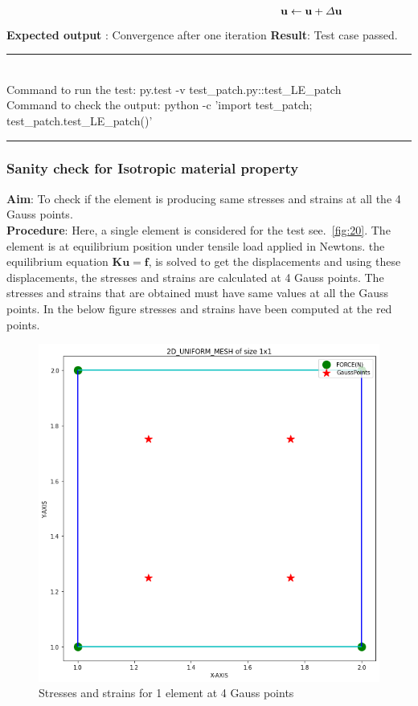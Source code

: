 \documentclass[fleqn, 12.5pt,a4paper]{report}
\begin{document}
\begin{align}\label{eq:114}\hspace{6.5cm}
\mathbf{u} \leftarrow \mathbf{u}+\Delta \mathbf{u}
\end{align}
\textbf{Expected output} : Convergence after one iteration\newline 
\textbf{Result}: Test case passed.\\
{\rule{\linewidth}{0.02cm}}\\
Command to run the test: {\selectfont py.test -v test{\_}patch.py::test{\_}LE{\_}patch}\\
Command to check the output: {\selectfont python -c 'import test{\_}patch;\\ test{\_}patch.test{\_}LE{\_}patch()'}\\
{\rule{\linewidth}{0.02cm}}

\subsubsection{Sanity check for Isotropic material property}
\textbf{Aim}: To check if the element is producing same stresses and strains at all the 4 Gauss points\cite{taylor2014feap}.\\
\textbf{Procedure}: Here, a single element is considered for the test see.~\autoref{fig:20}. The element is at equilibrium position under tensile load applied in Newtons. the equilibrium equation $\mathbf{Ku} = \mathbf{f}$, is solved to get the displacements and using these displacements, the stresses and strains are calculated at 4 Gauss points. The stresses and strains that are obtained must have same values at all the Gauss points. In the below figure stresses and strains have been computed at the red points.
\begin{figure}[h]
    \centering
    \includegraphics[scale = 0.5]{1x1 stress strain.png}
    \caption{{Stresses and strains for 1 element at 4 Gauss points}}
    \label{fig:20}
\end{figure}
\end{document}
